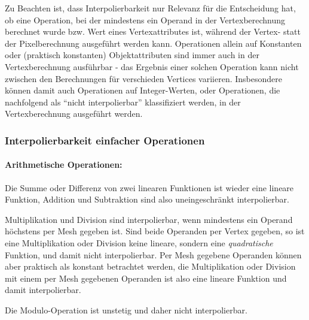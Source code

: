 \documentclass[twoside,a4paper,fleqn,12pt]{book}
\begin{document}
Zu Beachten ist, dass Interpolierbarkeit nur Relevanz für die Entscheidung hat, ob eine Operation, bei der mindestens ein Operand in der Vertexberechnung
berechnet wurde bzw. Wert eines Vertexattributes ist, während der Vertex- statt der Pixelberechnung ausgeführt werden kann.
Operationen allein auf Konstanten oder (praktisch konstanten) Objektattributen sind immer auch in der Vertexberechnung ausführbar - das Ergebnis
einer solchen Operation kann nicht zwischen den Berechnungen für verschieden Vertices variieren. Insbesondere können damit
auch Operationen auf Integer-Werten, oder Operationen, die nachfolgend als "`nicht interpolierbar"' klassifiziert werden,
in der Vertexberechnung ausgeführt werden.



\subsubsection{Interpolierbarkeit einfacher Operationen}

\paragraph{Arithmetische Operationen:} Die Summe oder Differenz von zwei linearen Funktionen
ist wieder eine lineare Funktion, Addition und Subtraktion sind also uneingeschränkt interpolierbar.

Multiplikation und Division sind interpolierbar, wenn mindestens ein Operand höchstens per Mesh gegeben ist.
Sind beide Operanden per Vertex gegeben, so ist eine Multiplikation oder Division keine lineare,
sondern eine \emph{quadratische} Funktion, und damit nicht interpolierbar. Per Mesh gegebene Operanden können aber praktisch als
konstant betrachtet werden, die Multiplikation oder Division mit einem per Mesh gegebenen
Operanden ist also eine lineare Funktion und damit interpolierbar.

Die Modulo-Operation ist unstetig und daher nicht interpolierbar.
\end{document}
